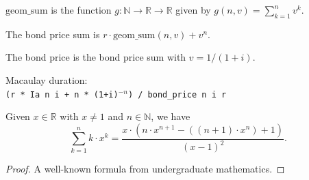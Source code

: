 \begin{definition}\label{geom_sum}
	\leanok
	$\mathrm{geom\_sum}$ is the function $g : \mathbb N \to \mathbb R \to \mathbb R$ given by
	$g(n,v)=
	  \sum_{k=1}^n v ^ k$.
\end{definition}

\begin{definition}\label{bond_price_sum}
	\leanok
The bond price sum is
$r \cdot \text{geom\_sum} (n, v) + v ^ n$.
\end{definition}

\begin{definition}\label{bond_price}
	\leanok
The bond price is the bond price sum with $v=1/(1+i)$.
\end{definition}

\begin{definition}[\texttt{D}]\label{D}
	\leanok
	Macaulay duration:\\
    \verb!(r * Ia n i + n * (1+i)!$^{-n}$\verb!) / bond_price n i r!
\end{definition}



\begin{lemma}\label{id_mul_geom_sum_formula}
	\leanok
Given $x\in\mathbb R$ with $x \ne 1$ and $n\in \mathbb N$, we have
\[
	\sum_{k=1}^n k \cdot x^k =
	  \frac{x \cdot (n \cdot x ^ {n + 1} - ((n + 1) \cdot x ^ n) + 1)}{(x - 1) ^ 2}.
\]
\end{lemma}
\begin{proof}
	\leanok
	A well-known formula from undergraduate mathematics.
\end{proof}


